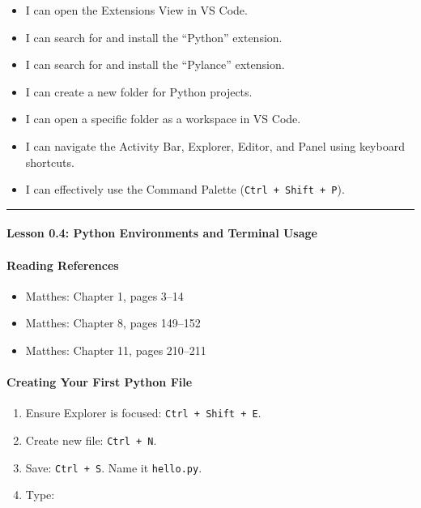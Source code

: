 \documentclass[
  justified,
  openright,
]{tufte-book}
\let\subsection\paragraph
\let\paragraph\paragraph
\let\subsection\paragraph
\let\paragraph\paragraph
\providecommand{\tightlist}{%
  \setlength{\itemsep}{0pt}\setlength{\parskip}{0pt}}
\begin{document}
\begin{itemize}
\tightlist
\item[$\square$]
  I can open the Extensions View in VS Code.
\item[$\square$]
  I can search for and install the ``Python'' extension.
\item[$\square$]
  I can search for and install the ``Pylance'' extension.
\item[$\square$]
  I can create a new folder for Python projects.
\item[$\square$]
  I can open a specific folder as a workspace in VS Code.
\item[$\square$]
  I can navigate the Activity Bar, Explorer, Editor, and Panel using
  keyboard shortcuts.
\item[$\square$]
  I can effectively use the Command Palette
  (\texttt{Ctrl\ +\ Shift\ +\ P}).
\end{itemize}

\begin{center}\rule{0.5\linewidth}{0.5pt}\end{center}

\subsection{Lesson 0.4: Python Environments and Terminal
Usage}\label{lesson-0.4-python-environments-and-terminal-usage-1}

\subsection{Reading References}\label{reading-references-3}

\begin{itemize}
\tightlist
\item
  Matthes: Chapter 1, pages 3--14
\item
  Matthes: Chapter 8, pages 149--152
\item
  Matthes: Chapter 11, pages 210--211
\end{itemize}

\subsection{Creating Your First Python
File}\label{creating-your-first-python-file}

\begin{enumerate}
\def\labelenumi{\arabic{enumi}.}
\tightlist
\item
  Ensure Explorer is focused: \texttt{Ctrl\ +\ Shift\ +\ E}.
\item
  Create new file: \texttt{Ctrl\ +\ N}.
\item
  Save: \texttt{Ctrl\ +\ S}. Name it \texttt{hello.py}.
\item
  Type:
\end{enumerate}
\end{document}
